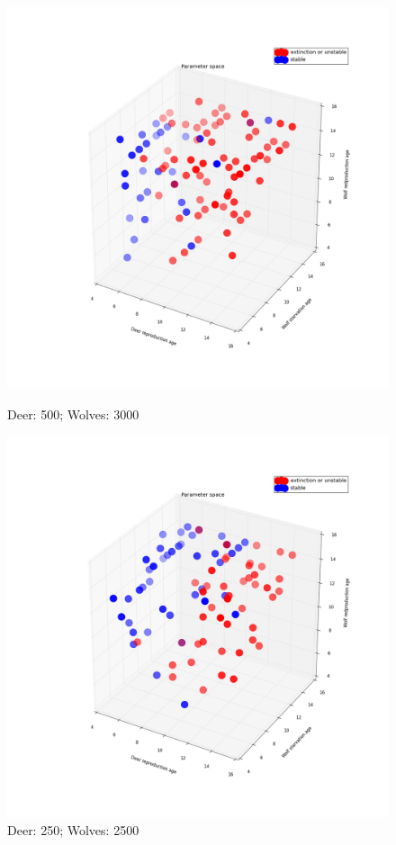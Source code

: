 \documentclass{beamer}
\begin{document}
{  \begin{figure}[ht]
  \centering
                \begin{minipage}[b]{.27\linewidth}
                \includegraphics[width = 1\linewidth]{./pics/Restricted_Parameter_space_d500_w3000.png}
                \caption{\tiny{Deer: 500; Wolves: 3000}}
                \end{minipage}
                \quad
		\begin{minipage}[b]{.27\linewidth}
                \includegraphics[width = 1\linewidth]{./pics/Restricted_Parameter_space_d250_w2500.png}
                \caption{\tiny{Deer: 250; Wolves: 2500}}
		\end{minipage}
  \end{figure}
}
\end{document}
